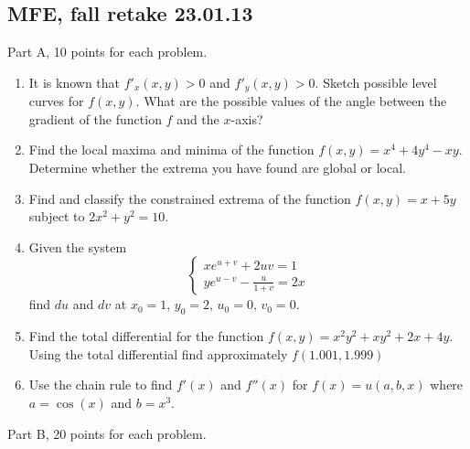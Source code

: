 \documentclass[12pt]{article} %
\theoremstyle{definition} %
\begin{document}
\subsection{MFE, fall retake 23.01.13}

Part A, 10 points for each problem.

\vspace{20pt}

\begin{enumerate}
\item It is known that $f'_x(x,y)>0$ and $f'_y(x,y)>0$. Sketch possible level curves for $f(x,y)$. What are the possible values of the angle between the gradient of the function $f$ and the $x$-axis?
\item Find the local maxima and minima of the function $f(x,y)=x^4+4y^4-xy$. Determine whether the extrema you have found are global or local.
\item Find and classify the constrained extrema of the function $f(x,y)=x+5y$ subject to $2x^2+y^2=10$.

\item Given the system
\[
\begin{cases}
xe^{u+v}+2uv=1 \\
ye^{u-v}-\frac{u}{1+v}=2x
\end{cases}
\]
find $du$ and $dv$ at $x_0 = 1$, $y_0 = 2$, $u_0 = 0$, $v_0 = 0$.

\item Find the total differential for the function $f(x,y)=x^2y^2+xy^2+2x+4y$. Using the total differential find approximately $f(1.001,1.999)$

\item Use the chain rule to find $f'(x)$ and $f''(x)$ for $f(x)=u(a,b,x)$ where $a=\cos(x)$ and $b=x^3$.

\end{enumerate}

\vspace{20pt}

Part B, 20 points for each problem.

\vspace{20pt}
\end{document}
